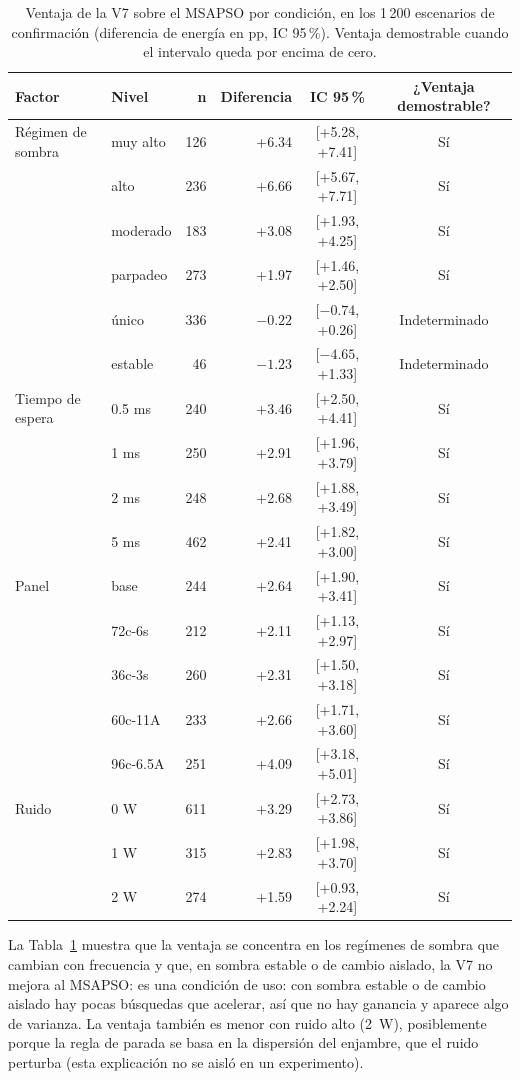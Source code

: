 \documentclass[letterpaper,11pt]{article}
\begin{document}
\begin{table}[H]
  \centering
  \caption{Ventaja de la V7 sobre el MSAPSO por condición, en los 1\,200 escenarios de confirmación (diferencia de energía en pp, IC 95\,\%). Ventaja demostrable cuando el intervalo queda por encima de cero.}
  \label{tab:condicion}
  \small
  \begin{tabular}{@{}llrrcc@{}}
    \toprule
    \textbf{Factor} & \textbf{Nivel} & \textbf{n} & \textbf{Diferencia} & \textbf{IC 95\,\%} & \textbf{¿Ventaja demostrable?} \\
    \midrule
    Régimen de sombra & muy alto & 126 & +6.34 & [+5.28, +7.41] & Sí \\
     & alto & 236 & +6.66 & [+5.67, +7.71] & Sí \\
     & moderado & 183 & +3.08 & [+1.93, +4.25] & Sí \\
     & parpadeo & 273 & +1.97 & [+1.46, +2.50] & Sí \\
     & único & 336 & $-0.22$ & [$-0.74$, +0.26] & Indeterminado \\
     & estable & 46 & $-1.23$ & [$-4.65$, +1.33] & Indeterminado \\
    \addlinespace
    Tiempo de espera & 0.5 ms & 240 & +3.46 & [+2.50, +4.41] & Sí \\
     & 1 ms & 250 & +2.91 & [+1.96, +3.79] & Sí \\
     & 2 ms & 248 & +2.68 & [+1.88, +3.49] & Sí \\
     & 5 ms & 462 & +2.41 & [+1.82, +3.00] & Sí \\
    \addlinespace
    Panel & base & 244 & +2.64 & [+1.90, +3.41] & Sí \\
     & 72c-6s & 212 & +2.11 & [+1.13, +2.97] & Sí \\
     & 36c-3s & 260 & +2.31 & [+1.50, +3.18] & Sí \\
     & 60c-11A & 233 & +2.66 & [+1.71, +3.60] & Sí \\
     & 96c-6.5A & 251 & +4.09 & [+3.18, +5.01] & Sí \\
    \addlinespace
    Ruido & 0 W & 611 & +3.29 & [+2.73, +3.86] & Sí \\
     & 1 W & 315 & +2.83 & [+1.98, +3.70] & Sí \\
     & 2 W & 274 & +1.59 & [+0.93, +2.24] & Sí \\
    \bottomrule
  \end{tabular}
\end{table}

La Tabla~\ref{tab:condicion} muestra que la ventaja se concentra en los regímenes de sombra que cambian con frecuencia y que, en sombra estable o de cambio aislado, la V7 no mejora al MSAPSO: es una condición de uso: con sombra estable o de cambio aislado hay pocas búsquedas que acelerar, así que no hay ganancia y aparece algo de varianza. La ventaja también es menor con ruido alto (2~W), posiblemente porque la regla de parada se basa en la dispersión del enjambre, que el ruido perturba (esta explicación no se aisló en un experimento).
\end{document}
